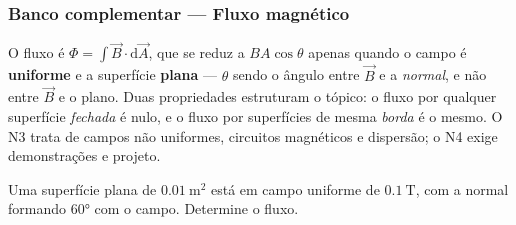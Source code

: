 
\subsubsection*{Banco complementar --- Fluxo magnético}

\begin{atencao}
O fluxo é $\Phi=\int\vec B\cdot\mathrm{d}\vec A$, que se reduz a
$BA\cos\theta$ apenas quando o campo é \textbf{uniforme} e a superfície
\textbf{plana} --- $\theta$ sendo o ângulo entre $\vec B$ e a \emph{normal}, e
não entre $\vec B$ e o plano. Duas propriedades estruturam o tópico: o fluxo por
qualquer superfície \emph{fechada} é nulo, e o fluxo por superfícies de mesma
\emph{borda} é o mesmo. O N3 trata de campos não uniformes, circuitos magnéticos
e dispersão; o N4 exige demonstrações e projeto.
\end{atencao}

\blocofixacao

\begin{questao}[1]{}
Uma superfície plana de $\SI{0.01}{\meter\squared}$ está em campo uniforme de
$\SI{0.1}{\tesla}$, com a normal formando $\ang{60}$ com o campo. Determine o
fluxo.
\end{questao}

